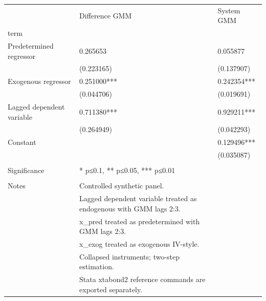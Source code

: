 \begin{tabular}{lll}
\toprule
 & Difference GMM & System GMM \\
term &  &  \\
\midrule
Predetermined regressor & 0.265653 & 0.055877 \\
 & (0.223165) & (0.137907) \\
Exogenous regressor & 0.251000*** & 0.242354*** \\
 & (0.044706) & (0.019691) \\
Lagged dependent variable & 0.711380*** & 0.929211*** \\
 & (0.264949) & (0.042293) \\
Constant &  & 0.129496*** \\
 &  & (0.035087) \\
 &  &  \\
Significance & * p≤0.1, ** p≤0.05, *** p≤0.01 &  \\
 &  &  \\
Notes & Controlled synthetic panel. &  \\
 & Lagged dependent variable treated as endogenous with GMM lags 2:3. &  \\
 & x_pred treated as predetermined with GMM lags 2:3. &  \\
 & x_exog treated as exogenous IV-style. &  \\
 & Collapsed instruments; two-step estimation. &  \\
 & Stata xtabond2 reference commands are exported separately. &  \\
\bottomrule
\end{tabular}
